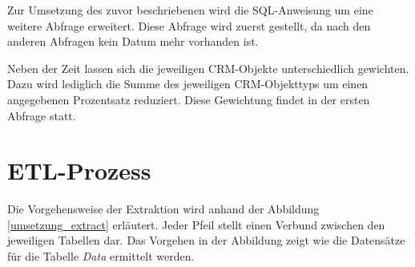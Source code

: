 Zur Umsetzung des zuvor beschriebenen wird die SQL-Anweisung um eine weitere Abfrage erweitert. Diese Abfrage wird zuerst gestellt, da nach den anderen Abfragen kein Datum mehr vorhanden ist. 

Neben der Zeit lassen sich die jeweiligen CRM-Objekte unterschiedlich gewichten. Dazu wird lediglich die Summe des jeweiligen CRM-Objekttyps um einen angegebenen Prozentsatz reduziert. Diese Gewichtung findet in der ersten Abfrage statt. 




\section{ETL-Prozess}

Die Vorgehensweise der Extraktion wird anhand der Abbildung \ref{umsetzung_extract} erläutert. Jeder Pfeil stellt einen Verbund zwischen den jeweiligen Tabellen dar. Das Vorgehen in der Abbildung zeigt wie die Datensätze für die Tabelle \textit{Data} ermittelt werden. 

